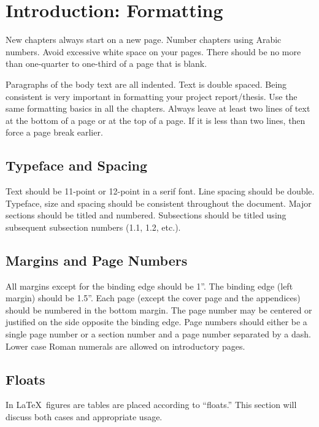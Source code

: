\chapter{Introduction: Formatting}
\label{cha:introduction}

New chapters always start on a new page.  Number chapters using Arabic numbers. Avoid excessive white space on your pages. There should be no more than one-quarter to one-third of a page that is blank.

Paragraphs of the body text are all indented.  Text is double spaced. Being consistent is very important in formatting your project report/thesis. Use the same formatting basics in all the chapters. Always leave at least two lines of text at the bottom of a page or at the top of a page. If it is less than two lines, then force a page break earlier.

\section{Typeface and Spacing}
\label{sec:typeface-spacing}

Text should be 11-point or 12-point in a serif font. Line spacing should be double. Typeface, size and spacing should be consistent throughout the document. Major sections should be titled and numbered. Subsections should be titled using subsequent subsection numbers (1.1, 1.2, etc.).

\section{Margins and Page Numbers}
\label{sec:margins-page-numbers}

All margins except for the binding edge should be 1''. The binding edge (left margin) should be 1.5''.  Each page (except the cover page and the appendices) should be numbered in the bottom margin. The page number may be centered or justified on the side opposite the binding edge. Page numbers should either be a single page number or a section number and a page number separated by a dash. Lower case Roman numerals are allowed on introductory pages.

\section{Floats}
\label{sec:floats}

In \LaTeX\, figures are tables are placed according to ``floats.''  This section will discuss both cases and appropriate usage.  


